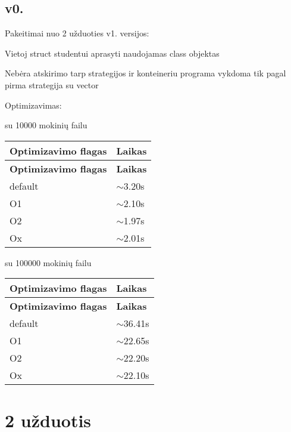 \subsection*{v0.}

Pakeitimai nuo 2 užduoties v1. versijos\+:
\begin{DoxyItemize}
\item Vietoj struct studentui aprasyti naudojamas class objektas
\item Nebėra atskirimo tarp strategijos ir konteineriu programa vykdoma tik pagal pirma strategija su vector
\end{DoxyItemize}

Optimizavimas\+:

su 10000 mokinių failu

\tabulinesep=1mm
\begin{longtabu} spread 0pt [c]{*{2}{|X[-1]}|}
\hline
\rowcolor{\tableheadbgcolor}\textbf{ Optimizavimo flagas  }&\textbf{ Laikas   }\\
\endfirsthead
\hline
\endfoot
\hline
\rowcolor{\tableheadbgcolor}\textbf{ Optimizavimo flagas  }&\textbf{ Laikas   }\\
\endhead
default  &$\sim$3.20s   \\
O1  &$\sim$2.10s   \\
O2  &$\sim$1.97s   \\
Ox  &$\sim$2.01s   \\
\end{longtabu}


su 100000 mokinių failu

\tabulinesep=1mm
\begin{longtabu} spread 0pt [c]{*{2}{|X[-1]}|}
\hline
\rowcolor{\tableheadbgcolor}\textbf{ Optimizavimo flagas  }&\textbf{ Laikas   }\\
\endfirsthead
\hline
\endfoot
\hline
\rowcolor{\tableheadbgcolor}\textbf{ Optimizavimo flagas  }&\textbf{ Laikas   }\\
\endhead
default  &$\sim$36.41s   \\
O1  &$\sim$22.65s   \\
O2  &$\sim$22.20s   \\
Ox  &$\sim$22.10s   \\
\end{longtabu}


\section*{2 užduotis}


